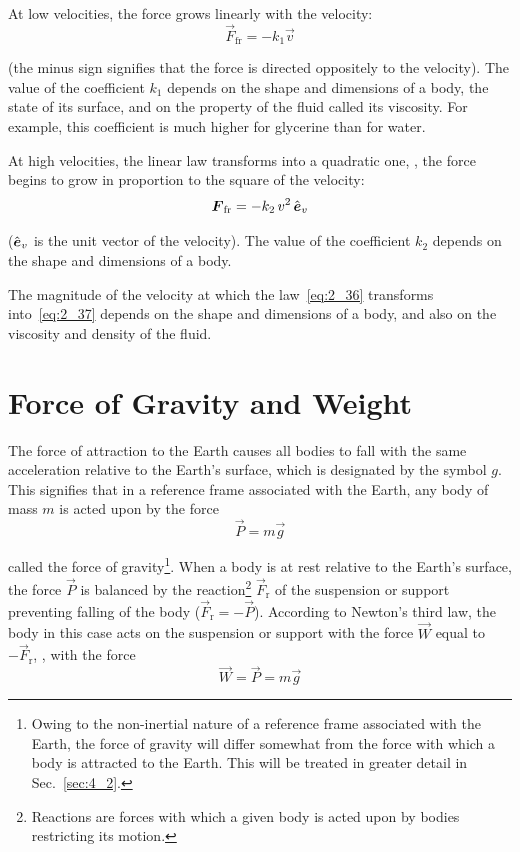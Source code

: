 At low velocities, the force grows linearly with the velocity:
\begin{equation}\label{eq:2_36}
\vec{F}_{\text{fr}} = -k_1 \vec{v}
\end{equation}

\noindent
(the minus sign signifies that the force is directed oppositely to the velocity). The value of the coefficient $k_1$ depends on the shape and dimensions of a body, the state of its surface, and on the property of the fluid called its viscosity. For example, this coefficient is much higher for glycerine than for water.

At high velocities, the linear law transforms into a quadratic one, \ie, the force begins to grow in proportion to the square of the velocity:
\begin{equation}\label{eq:2_37}
\boldsymbol{F}_{\text{fr}} = -k_2\, v^2\, \hat{\boldsymbol{e}}_{v}
\end{equation}

\noindent
($\hat{\boldsymbol{e}}_{v}$ is the unit vector of the velocity). The value of the coefficient $k_2$ depends on the shape and dimensions of a body.

The magnitude of the velocity at which the law~\eqref{eq:2_36} transforms into~\eqref{eq:2_37} depends on the shape and dimensions of a body, and also on the viscosity and density of the fluid.

\section{Force of Gravity and Weight}\label{sec:2_11}

The force of attraction to the Earth causes all bodies to fall with the same acceleration relative to the Earth's surface, which is designated by the symbol $g$. This signifies that in a reference frame associated with the Earth, any body of mass $m$ is acted upon by the force
\begin{equation}\label{eq:2_38}
\vec{P} = m\vec{g}
\end{equation}

\noindent
called the force of gravity\footnote{Owing to the non-inertial nature of a reference frame associated with the Earth, the force of gravity will differ somewhat from the force with which a body is attracted to the Earth. This will be treated in greater detail in Sec.~\ref{sec:4_2}.}. When a body is at rest relative to the Earth's surface, the force $\vec{P}$ is balanced by the reaction\footnote{Reactions are forces with which a given body is acted upon by bodies restricting its motion.} $\vec{F}_{\text{r}}$ of the suspension or support preventing falling of the body ($\vec{F}_{\text{r}}=-\vec{P}$). According to Newton's third law, the body in this case acts on the suspension or support with the force $\vec{W}$ equal to $-\vec{F}_{\text{r}}$, \ie, with the force
\begin{equation*}
\vec{W} = \vec{P} = m\vec{g}
\end{equation*}

